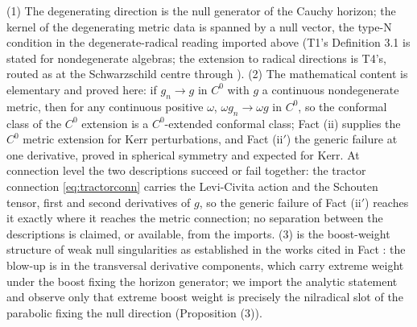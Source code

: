 (1) The degenerating direction is the null generator of the Cauchy horizon; the kernel of the degenerating metric data is spanned by a null vector, the type-N condition in the degenerate-radical reading imported above (T1's Definition 3.1 is stated for nondegenerate algebras; the extension to radical directions is T4's, routed as at the Schwarzschild centre through \cite[Prop.~3.1]{ButlerT5}). (2) The mathematical content is elementary and proved here: if $g_n \to g$ in $C^0$ with $g$ a continuous nondegenerate metric, then for any continuous positive $\omega$, $\omega g_n \to \omega g$ in $C^0$, so the conformal class of the $C^0$ extension is a $C^0$-extended conformal class; Fact (ii) supplies the $C^0$ metric extension for Kerr perturbations, and Fact (ii$'$) the generic failure at one derivative, proved in spherical symmetry and expected for Kerr. At connection level the two descriptions succeed or fail together: the tractor connection \eqref{eq:tractorconn} carries the Levi-Civita action and the Schouten tensor, first and second derivatives of $g$, so the generic failure of Fact (ii$'$) reaches it exactly where it reaches the metric connection; no separation between the descriptions is claimed, or available, from the imports. (3) is the boost-weight structure of weak null singularities as established in the works cited in Fact : the blow-up is in the transversal derivative components, which carry extreme weight under the boost fixing the horizon generator; we import the analytic statement and observe only that extreme boost weight is precisely the nilradical slot of the parabolic fixing the null direction (Proposition (3)).
